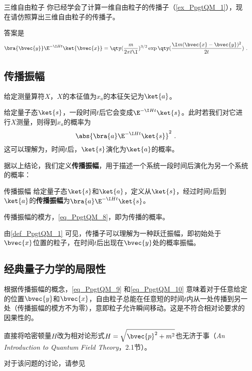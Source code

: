 \begin{exercise}{三维自由粒子}
你已经学会了计算一维自由粒子的传播子（\autoref{ex_PpgtQM_1}），现在请仿照算出三维自由粒子的传播子。

答案是
\begin{equation}\label{eq_PpgtQM_10}
\bra{\bvec{y}}\E^{-\I H t}\ket{\bvec{x}} = \qty(\frac{m}{2\pi t\I})^{3/2}\exp\qty(\frac{\I m(\bvec{x}-\bvec{y})^2}{2t})~.
\end{equation}
\end{exercise}









\subsection{传播振幅}


给定测量算符$X$，$X$的本征值为$x_a$的本征矢记为$\ket{a}$。

给定量子态$\ket{s}$，一段时间$t$后它会变成$\E^{-\I Ht}\ket{s}$。此时若我们对它进行$X$测量，则得到$x_a$的概率为
\begin{equation}\label{eq_PpgtQM_8}
\abs{\bra{a}\E^{-\I Ht}\ket{s}}^2~.
\end{equation}
这可以理解为，时间$t$后，$\ket{s}$演化为$\ket{a}$的概率。

据以上结论，我们定义\textbf{传播振幅}，用于描述一个系统一段时间后演化为另一个系统的概率：

\begin{definition}{传播振幅}\label{def_PpgtQM_1}
给定量子态$\ket{s}$和$\ket{a}$，定义从$\ket{s}$，经过时间$t$后到$\ket{a}$的\textbf{传播振幅}为$\bra{a}\E^{-\I Ht}\ket{s}$。

传播振幅的模方，\autoref{eq_PpgtQM_8}，即为传播的概率。
\end{definition}

由\autoref{def_PpgtQM_1} 可见，传播子可以理解为一种跃迁振幅，即初始处于$\bvec{x}$位置的粒子，在时间$t$后出现在$\bvec{y}$处的概率振幅。




\subsection{经典量子力学的局限性}

根据传播振幅的概念，\autoref{eq_PpgtQM_9} 和\autoref{eq_PpgtQM_10} 意味着对于任意给定的位置$\bvec{y}$和$\bvec{x}$，自由粒子总能在任意短的时间$t$内从一处传播到另一处（传播振幅的模方不为零），意即粒子允许瞬间移动。这是不符合相对论要求的因果性的。

直接将哈密顿量$H$改为相对论形式$H=\sqrt{\bvec{p}^2+m^2}$也无济于事（\textsl{An Introduction to Quantum Field Theory}\cite{Peskin}，2.1节）。

对于该问题的讨论，请参见














